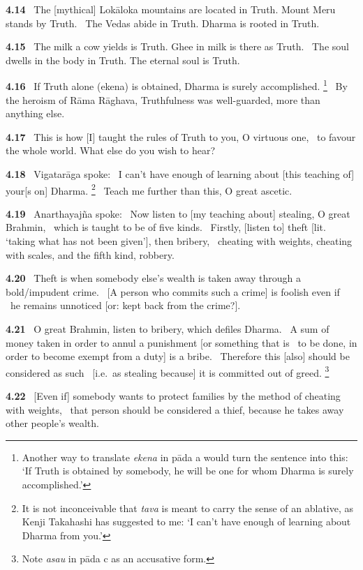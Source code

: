 \documentclass{article}
\newcommand{\skt}[1]{\textit{#1}}
\begin{document}
\textbf{4.14}%
\ The [mythical] Lokāloka mountains are located in Truth. Mount Meru stands by Truth.%
\ The Vedas abide in Truth. Dharma is rooted in Truth.%


\textbf{4.15}%
\ The milk a cow yields is Truth. Ghee in milk is there as Truth.%
\ The soul dwells in the body in Truth. The eternal soul is Truth.%


\textbf{4.16}%
\  If Truth alone (ekena) is obtained, Dharma is surely accomplished.%
\footnote{Another way to translate \skt{ekena} in pāda a would turn the sentence into this:               `If Truth is obtained by somebody, he will be one for whom Dharma is surely accomplished.' }%
\ By the heroism of Rāma Rāghava, Truthfulness was well-guarded, more than anything else.%


\textbf{4.17}%
\ This is how [I] taught the rules of Truth to you, O virtuous one,%
\ to favour the whole world. What else do you wish to hear?%


\textbf{4.18}%
\ Vigatarāga spoke:%
\ I can't have enough of learning about [this teaching of] your[s on] Dharma.%
\footnote{It is not inconceivable that \skt{tava} is meant to carry the sense of an ablative,                as Kenji Takahashi has suggested to me:                `I can't have enough of learning about Dharma from you.'  }%
\ Teach me further than this, O great ascetic.%


\textbf{4.19}%
\ Anarthayajña spoke:%
\ Now listen to [my teaching about] stealing, O great Brahmin,%
\                                 which is taught to be of five kinds.%
\ Firstly, [listen to] theft [lit. `taking what has not been given'], then bribery,%
\ cheating with weights, cheating with scales, and the fifth kind, robbery.%


\textbf{4.20}%
\ Theft is when somebody else's wealth is taken away through a bold/impudent crime.%
\ [A person who commits such a crime] is foolish even if%
\                 he remains unnoticed [or: kept back from the crime?].%


\textbf{4.21}%
\ O great Brahmin, listen to bribery, which defiles Dharma.%
\ A sum of money taken in order to annul a punishment [or something that is%
\                                         to be done, in order to become exempt from a duty] is a bribe.%
\ Therefore this [also] should be considered as such%
\                 [i.e.\ as stealing because] it is committed out of greed.%
\footnote{Note \skt{asau} in pāda c as an accusative form. }%


\textbf{4.22}%
\ [Even if] somebody wants to protect families by the method of cheating with weights,%
\ that person should be considered a thief, because he takes away other people's wealth.%
\end{document}
